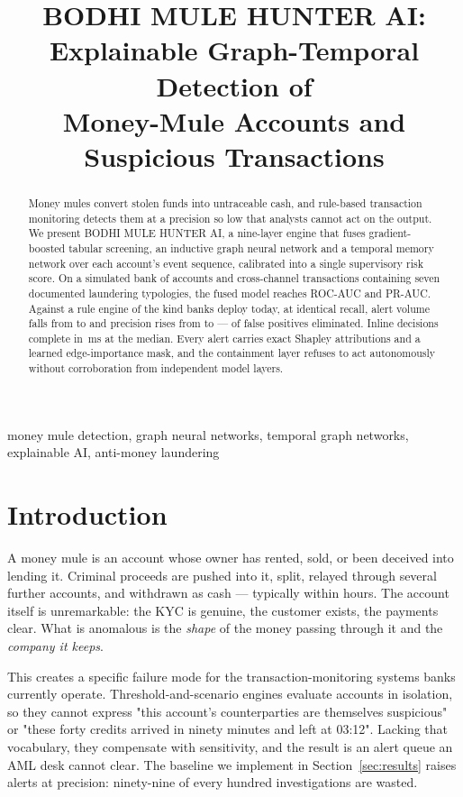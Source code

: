 \documentclass{article}
\title{BODHI MULE HUNTER AI: Explainable Graph-Temporal Detection of\\
       Money-Mule Accounts and Suspicious Transactions}
\begin{document}
\maketitle

\begin{abstract}
Money mules convert stolen funds into untraceable cash, and rule-based
transaction monitoring detects them at a precision so low that analysts cannot
act on the output. We present BODHI MULE HUNTER AI, a nine-layer engine that
fuses gradient-boosted tabular screening, an inductive graph neural network and
a temporal memory network over each account's event sequence, calibrated into a
single supervisory risk score. On a simulated bank of \dsAccounts{} accounts and
\dsTransactions{} cross-channel transactions containing seven documented
laundering typologies, the fused model reaches \aucFused{} ROC-AUC and
\apFused{} PR-AUC. Against a rule engine of the kind banks deploy today, at
identical recall, alert volume falls from  to \bodhiAlerts{} and
precision rises from  to \bodhiPrecision{} --- \fpReduction{} of
false positives eliminated. Inline decisions complete in \latPfifty{}\,ms at the
median. Every alert carries exact Shapley attributions and a learned
edge-importance mask, and the containment layer refuses to act autonomously
without corroboration from independent model layers.
\end{abstract}

\begin{keywords}
money mule detection, graph neural networks, temporal graph networks,
explainable AI, anti-money laundering
\end{keywords}

\section{Introduction}
\label{sec:intro}

A money mule is an account whose owner has rented, sold, or been deceived into
lending it. Criminal proceeds are pushed into it, split, relayed through several
further accounts, and withdrawn as cash --- typically within hours. The account
itself is unremarkable: the KYC is genuine, the customer exists, the payments
clear. What is anomalous is the \emph{shape} of the money passing through it and
the \emph{company it keeps}.

This creates a specific failure mode for the transaction-monitoring systems
banks currently operate. Threshold-and-scenario engines evaluate accounts in
isolation, so they cannot express "this account's counterparties are themselves
suspicious" or "these forty credits arrived in ninety minutes and left at
03:12". Lacking that vocabulary, they compensate with sensitivity, and the
result is an alert queue an AML desk cannot clear. The baseline we implement in
Section~\ref{sec:results} raises  alerts at 
precision: ninety-nine of every hundred investigations are wasted.
\end{document}
